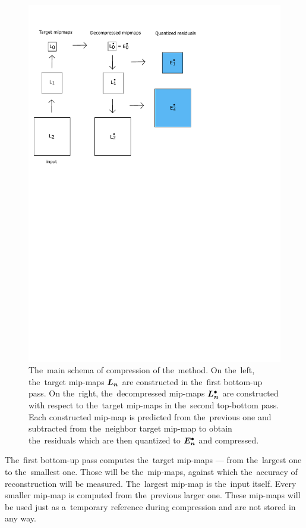 	\begin{figure}
		\includegraphics[trim={0 15cm 6cm 1cm}, clip, width=1\textwidth]{figures/main_schema.pdf}\centering
		\caption{The~main schema of compression of the~method. On the~left, the~target mip-maps $\lnorm{n}$ are constructed in the~first bottom-up pass. On the~right, the~decompressed mip-maps $\ldot{n}$ are constructed with respect to the~target mip-maps in the~second top-bottom pass. Each constructed mip-map is predicted from the~previous one and subtracted from the~neighbor target mip-map to obtain the~residuals which are then quantized to $\objdot{E}{n}$ and compressed.}
		\label{fig:main_schema}
	\end{figure}

The~first bottom-up pass computes the~target mip-maps --- from the~largest one to the~smallest one. Those will be the~mip-maps, against which the~accuracy of reconstruction will be measured. The~largest mip-map is the~input itself. Every smaller mip-map is computed from the~previous larger one. These mip-maps will be used just as a~temporary reference during compression and are not stored in any way.


